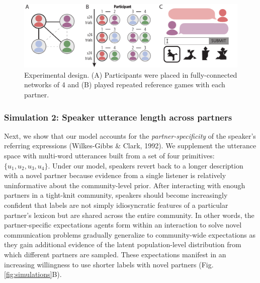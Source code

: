 \documentclass[10pt, letterpaper]{article}
\newenvironment{CodeChunk}{}{}
\begin{document}
\begin{CodeChunk}
\begin{figure}[t!]

{\centering \includegraphics{figs/design} 

}

\caption{\label{fig:task1_display} Experimental design. (A) Participants were placed in fully-connected networks of 4 and (B) played repeated reference games with each partner.}\label{fig:task_display}
\end{figure}
\end{CodeChunk}

\hypertarget{simulation-2-speaker-utterance-length-across-partners}{%
\subsubsection{Simulation 2: Speaker utterance length across
partners}\label{simulation-2-speaker-utterance-length-across-partners}}

Next, we show that our model accounts for the \emph{partner-specificity}
of the speaker's referring expressions (Wilkes-Gibbs \& Clark, 1992). We
supplement the utterance space with multi-word utterances built from a
set of four primitives: \(\{u_1, u_2, u_3, u_4\}\). Under our model,
speakers revert back to a longer description with a novel partner
because evidence from a single listener is relatively uninformative
about the community-level prior. After interacting with enough partners
in a tight-knit community, speakers should become increasingly confident
that labels are not simply idiosyncratic features of a particular
partner's lexicon but are shared across the entire community. In other
words, the partner-specific expectations agents form within an
interaction to solve novel communication problems gradually generalize
to community-wide expectations as they gain additional evidence of the
latent population-level distribution from which different partners are
sampled. These expectations manifest in an increasing willingness to use
shorter labels with novel partners (Fig. \ref{fig:simulations}B).
\end{document}
